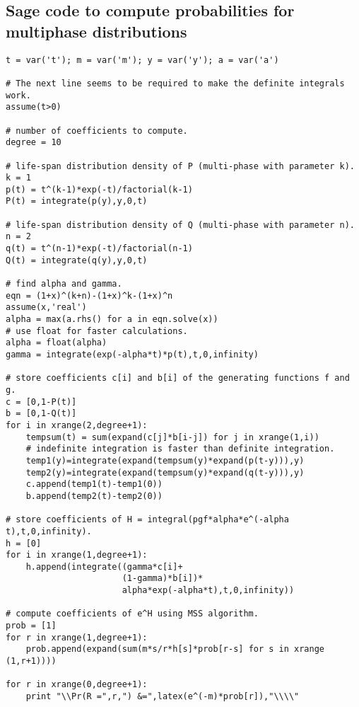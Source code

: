 \documentclass[12pt]{amsart}
\theoremstyle{plain}
\theoremstyle{definition}
\theoremstyle{remark}
\theoremstyle{definition}
\begin{document}
\normalsize

\subsection{Sage code to compute probabilities for multiphase distributions}
\label{sage-code}

\begin{verbatim}
t = var('t'); m = var('m'); y = var('y'); a = var('a')

# The next line seems to be required to make the definite integrals work.
assume(t>0)

# number of coefficients to compute.
degree = 10

# life-span distribution density of P (multi-phase with parameter k).
k = 1
p(t) = t^(k-1)*exp(-t)/factorial(k-1)
P(t) = integrate(p(y),y,0,t)

# life-span distribution density of Q (multi-phase with parameter n).
n = 2
q(t) = t^(n-1)*exp(-t)/factorial(n-1)
Q(t) = integrate(q(y),y,0,t)

# find alpha and gamma.
eqn = (1+x)^(k+n)-(1+x)^k-(1+x)^n
assume(x,'real')
alpha = max(a.rhs() for a in eqn.solve(x))
# use float for faster calculations.
alpha = float(alpha)
gamma = integrate(exp(-alpha*t)*p(t),t,0,infinity)

# store coefficients c[i] and b[i] of the generating functions f and g.
c = [0,1-P(t)]
b = [0,1-Q(t)]
for i in xrange(2,degree+1):
    tempsum(t) = sum(expand(c[j]*b[i-j]) for j in xrange(1,i))
    # indefinite integration is faster than definite integration.
    temp1(y)=integrate(expand(tempsum(y)*expand(p(t-y))),y)
    temp2(y)=integrate(expand(tempsum(y)*expand(q(t-y))),y)
    c.append(temp1(t)-temp1(0))
    b.append(temp2(t)-temp2(0))

# store coefficients of H = integral(pgf*alpha*e^(-alpha t),t,0,infinity).
h = [0]
for i in xrange(1,degree+1):
    h.append(integrate((gamma*c[i]+
                       (1-gamma)*b[i])*
                       alpha*exp(-alpha*t),t,0,infinity))

# compute coefficients of e^H using MSS algorithm.
prob = [1]
for r in xrange(1,degree+1):
    prob.append(expand(sum(m*s/r*h[s]*prob[r-s] for s in xrange (1,r+1))))

for r in xrange(0,degree+1):
    print "\\Pr(R =",r,") &=",latex(e^(-m)*prob[r]),"\\\\"
\end{verbatim}
\end{document}
